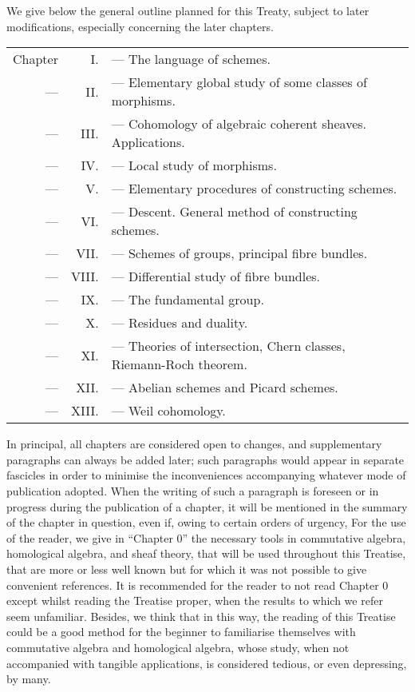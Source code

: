 \documentclass[../main.tex]{subfiles}
\begin{document}
\asttri

We give below the general outline planned for this Treaty, subject to later modifications, especially concerning the later chapters.

\begin{tabular}{rrl}
    Chapter & I. & --- The language of schemes.\\
    --- & II. & --- Elementary global study of some classes of morphisms.\\
    --- & III. & --- Cohomology of algebraic coherent sheaves. Applications.\\
    --- & IV. & --- Local study of morphisms.\\
    --- & V. & --- Elementary procedures of constructing schemes.\\
    --- & VI. & --- Descent. General method of constructing schemes.\\
    --- & VII. & --- Schemes of groups, principal fibre bundles.\\
    --- & VIII. & --- Differential study of fibre bundles.\\
    --- & IX. & --- The fundamental group.\\
    --- & X. & --- Residues and duality.\\
    --- & XI. & --- Theories of intersection, Chern classes, Riemann-Roch theorem.\\
    --- & XII. & --- Abelian schemes and Picard schemes.\\
    --- & XIII. & --- Weil cohomology.
\end{tabular}

In principal, all chapters are considered open to changes, and supplementary paragraphs can always be added later; such paragraphs would appear in separate fascicles in order to minimise the inconveniences accompanying whatever mode of publication adopted.
When the writing of such a paragraph is foreseen or in progress during the publication of a chapter, it will be mentioned in the summary of the chapter in question, even if, owing to certain orders of urgency, 
For the use of the reader, we give in ``Chapter 0'' the necessary tools in commutative algebra, homological algebra, and sheaf theory, that will be used throughout this Treatise, that are more or less well known but for which it was not possible to give convenient references.
It is recommended for the reader to not read Chapter 0 except whilst reading the Treatise proper, when the results to which we refer seem unfamiliar.
Besides, we think that in this way, the reading of this Treatise could be a good method for the beginner to familiarise themselves with commutative algebra and homological algebra, whose study, when not accompanied with tangible applications, is considered tedious, or even depressing, by many.
\end{document}
